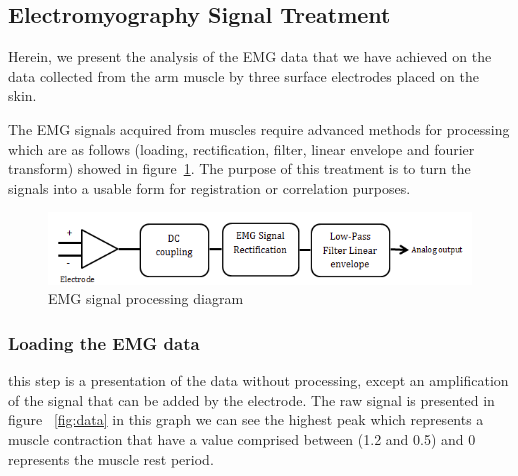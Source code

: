 \documentclass[conference]{IEEEtran}
\begin{document}
\subsection{Electromyography Signal Treatment} \label{sub:EMGsignaltreatment}\par
Herein, we present the analysis of the EMG data that we have achieved on the data collected from the arm muscle by three surface electrodes placed on the skin.\par
The EMG signals acquired from muscles require advanced methods for processing which are as follows (loading, rectification, filter, linear envelope and fourier transform) showed in figure~\ref{fig:struct}. The purpose of this treatment is to turn the signals into a usable form  for registration or correlation purposes.\par

\begin{figure}[!hb]
    \includegraphics[scale=0.45]{fig0.png}
    \caption{EMG signal processing diagram}
    \label{fig:struct}
\end{figure}


\subsubsection{Loading the EMG data} \label{sub:LoadingtheEMGdata}\par
this step is a presentation of the data without processing, except an amplification of the signal that can be added by the electrode. The raw signal is presented in figure~ \ref{fig:data} in this graph we can see the highest peak which represents a muscle contraction that have a value comprised between (1.2 and 0.5) and 0 represents the muscle rest period.\par
\end{document}
